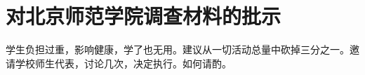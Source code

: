 \section[对北京师范学院调查材料的批示（一九六五年七月三日）]{对北京师范学院调查材料的批示}


学生负担过重，影响健康，学了也无用。建议从一切活动总量中砍掉三分之一。邀请学校师生代表，讨论几次，决定执行。如何请酌。


